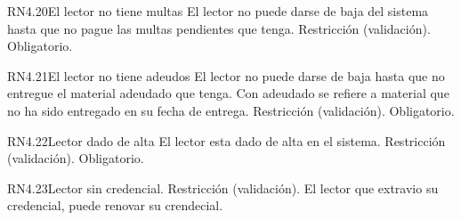 
\begin{BussinesRule}{RN4.20}{El lector no tiene multas} 
	\BRitem[Descripción:] El lector no puede darse de baja del sistema hasta que no pague las multas pendientes que tenga.
	\BRitem[Tipo:] Restricción (validación).
	\BRitem[Nivel:] Obligatorio.
\end{BussinesRule}


\begin{BussinesRule}{RN4.21}{El lector no tiene adeudos} 
	\BRitem[Descripción:] El lector no puede darse de baja hasta que no entregue el material adeudado que tenga. Con adeudado se refiere a material que no ha sido entregado en su fecha de entrega.
	\BRitem[Tipo:] Restricción (validación).
	\BRitem[Nivel:] Obligatorio.
\end{BussinesRule}


\begin{BussinesRule}{RN4.22}{Lector dado de alta} 
	\BRitem[Descripción:] El lector esta dado de alta en el sistema.
	\BRitem[Tipo:] Restricción (validación).
	\BRitem[Nivel:] Obligatorio.
\end{BussinesRule}


\begin{BussinesRule}{RN4.23}{Lector sin credencial.}
	\BRitem[Tipo:] Restricción (validación).
	\BRitem[Descripción:] El lector que extravio su credencial, puede renovar su crendecial.
\end{BussinesRule}


